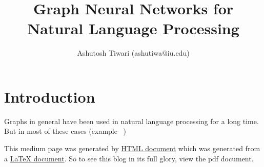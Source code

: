 \documentclass{article}
\title{\textbf{Graph Neural Networks for Natural Language Processing}}
\author{Ashutosh Tiwari (ashutiwa@iu.edu)}
\begin{document}
\maketitle

\section{Introduction}

    Graphs in general have been used in natural language processing for a long time. But in most of these cases (example ~\cite{erkan-2006-language})



This medium page was generated by \href{https://thunderock.github.io/blogs/introduction.html}{HTML document} which was generated from a \href{https://thunderock.github.io/blog_pdfs/introduction.pdf}{LaTeX document}. So to see this blog in its full glory, view the pdf document.



\end{document}
